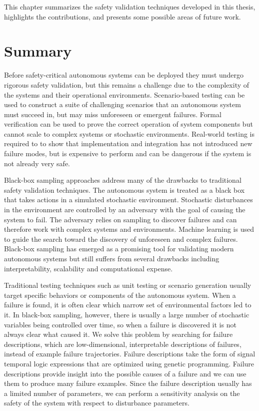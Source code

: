 This chapter summarizes the safety validation techniques developed in this thesis, highlights the contributions, and presents some possible areas of future work.

\section{Summary}
Before safety-critical autonomous systems can be deployed they must undergo rigorous safety validation, but this remains a challenge due to the complexity of the systems and their operational environments. Scenario-based testing can be used to construct a suite of challenging scenarios that an autonomous system must succeed in, but may miss unforeseen or emergent failures. Formal verification can be used to prove the correct operation of system components but cannot scale to complex systems or stochastic environments. Real-world testing is required to to show that implementation and integration has not introduced new failure modes, but is expensive to perform and can be dangerous if the system is not already very safe. 

Black-box sampling approaches address many of the drawbacks to traditional safety validation techniques. The autonomous system is treated as a black box that takes actions in a simulated stochastic environment. Stochastic disturbances in the environment are controlled by an adversary with the goal of causing the system to fail. The adversary relies on sampling to discover failures and can therefore work with complex systems and environments. Machine learning is used to guide the search toward the discovery of unforeseen and complex failures. Black-box sampling has emerged as a promising tool for validating modern autonomous systems but still suffers from several drawbacks including interpretability, scalability and computational expense. 

Traditional testing techniques such as unit testing or scenario generation usually target specific behaviors or components of the autonomous system. When a failure is found, it is often clear which narrow set of environmental factors led to it. In black-box sampling, however, there is usually a large number of stochastic variables being controlled over time, so when a failure is discovered it is not always clear what caused it. We solve this problem by searching for failure descriptions, which are low-dimensional, interpretable descriptions of failures, instead of example failure trajectories. Failure descriptions take the form of signal temporal logic expressions that are optimized using genetic programming. Failure descriptions provide insight into the possible causes of a failure and we can use them to produce many failure examples. Since the failure description usually has a limited number of parameters, we can perform a sensitivity analysis on the safety of the system with respect to disturbance parameters. 

